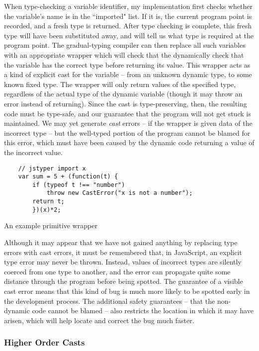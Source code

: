 \documentclass[12pt,a4paper,twoside,openright]{report}
\begin{document}
When type-checking a variable identifier, my implementation first checks
whether the variable's name is in the ``imported" list. If it is, the current
program point is recorded, and a fresh type is returned. After type checking is
complete, this fresh type will have been substituted away, and will tell us
what type is required at the program point. The gradual-typing compiler can
then replace all such variables with an appropriate wrapper which will check
that the dynamically check that the variable has the correct type before
returning its value.  This wrapper acts as a kind of explicit cast for the
variable -- from an unknown dynamic type, to some known fixed type. The wrapper
will only return values of the specified type, regardless of the actual type of
the dynamic variable (though it may throw an error instead of returning).
Since the cast is type-preserving, then, the resulting code must be type-safe,
and our guarantee that the program will not get stuck is maintained. We may yet
generate \textit{cast} errors -- if the wrapper is given data of the incorrect type --
but the well-typed portion of the program cannot be blamed for this error,
which must have been caused by the dynamic code returning a value of the
incorrect value. 

\begin{program}
  \begin{verbatim}
	// jstyper import x
	var sum = 5 + (function(t) {
		if (typeof t !== "number") 
			throw new CastError("x is not a number");
		return t;
		})(x)*2;
  \end{verbatim}
  \caption{An example primitive wrapper}\label{lst:importPrim}
\end{program}
Although it may appear that we have not gained anything by replacing type
errors with cast errors, it must be remembered that, in JavaScript, an explicit
type error may never be thrown. Instead, values of incorrect types are silently
coerced from one type to another, and the error can propagate quite some
distance through the program before being spotted. The guarantee of a visible
cast error means that this kind of bug is much more likely to be spotted early
in the development process. The additional safety guarantees -- that the
non-dynamic code cannot be blamed -- also restricts the location in which it
may have arisen, which will help locate and correct the bug much faster.

\subsubsection{Higher Order Casts}
\end{document}
